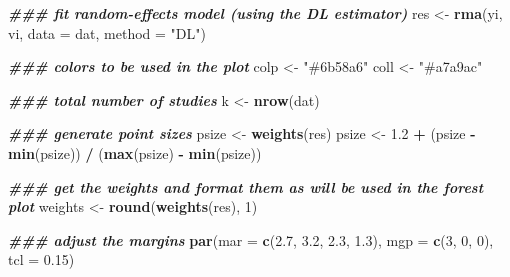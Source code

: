 \documentclass[
]{book}
\newenvironment{Shaded}{\begin{snugshade}}{\end{snugshade}}
\newcommand{\AttributeTok}[1]{\textcolor[rgb]{0.13,0.29,0.53}{#1}}
\newcommand{\DecValTok}[1]{\textcolor[rgb]{0.00,0.00,0.81}{#1}}
\newcommand{\DocumentationTok}[1]{\textcolor[rgb]{0.56,0.35,0.01}{\textbf{\textit{#1}}}}
\newcommand{\FloatTok}[1]{\textcolor[rgb]{0.00,0.00,0.81}{#1}}
\newcommand{\FunctionTok}[1]{\textcolor[rgb]{0.13,0.29,0.53}{\textbf{#1}}}
\newcommand{\NormalTok}[1]{#1}
\newcommand{\OtherTok}[1]{\textcolor[rgb]{0.56,0.35,0.01}{#1}}
\newcommand{\SpecialCharTok}[1]{\textcolor[rgb]{0.81,0.36,0.00}{\textbf{#1}}}
\newcommand{\StringTok}[1]{\textcolor[rgb]{0.31,0.60,0.02}{#1}}
\begin{document}
\begin{Shaded}
\begin{Highlighting}[]
\DocumentationTok{\#\#\# fit random{-}effects model (using the DL estimator)}
\NormalTok{res }\OtherTok{\textless{}{-}} \FunctionTok{rma}\NormalTok{(yi, vi, }\AttributeTok{data =}\NormalTok{ dat, }\AttributeTok{method =} \StringTok{"DL"}\NormalTok{)}

\DocumentationTok{\#\#\# colors to be used in the plot}
\NormalTok{colp }\OtherTok{\textless{}{-}} \StringTok{"\#6b58a6"}
\NormalTok{coll }\OtherTok{\textless{}{-}} \StringTok{"\#a7a9ac"}

\DocumentationTok{\#\#\# total number of studies}
\NormalTok{k }\OtherTok{\textless{}{-}} \FunctionTok{nrow}\NormalTok{(dat)}

\DocumentationTok{\#\#\# generate point sizes}
\NormalTok{psize }\OtherTok{\textless{}{-}} \FunctionTok{weights}\NormalTok{(res)}
\NormalTok{psize }\OtherTok{\textless{}{-}} \FloatTok{1.2} \SpecialCharTok{+}\NormalTok{ (psize }\SpecialCharTok{{-}} \FunctionTok{min}\NormalTok{(psize)) }\SpecialCharTok{/}\NormalTok{ (}\FunctionTok{max}\NormalTok{(psize) }\SpecialCharTok{{-}} \FunctionTok{min}\NormalTok{(psize))}

\DocumentationTok{\#\#\# get the weights and format them as will be used in the forest plot}
\NormalTok{weights }\OtherTok{\textless{}{-}} \FunctionTok{round}\NormalTok{(}\FunctionTok{weights}\NormalTok{(res), }\DecValTok{1}\NormalTok{)}

\DocumentationTok{\#\#\# adjust the margins}
\FunctionTok{par}\NormalTok{(}\AttributeTok{mar =} \FunctionTok{c}\NormalTok{(}\FloatTok{2.7}\NormalTok{, }\FloatTok{3.2}\NormalTok{, }\FloatTok{2.3}\NormalTok{, }\FloatTok{1.3}\NormalTok{), }\AttributeTok{mgp =} \FunctionTok{c}\NormalTok{(}\DecValTok{3}\NormalTok{, }\DecValTok{0}\NormalTok{, }\DecValTok{0}\NormalTok{), }\AttributeTok{tcl =} \FloatTok{0.15}\NormalTok{)}


\end{Highlighting}
\end{Shaded}
\end{document}
